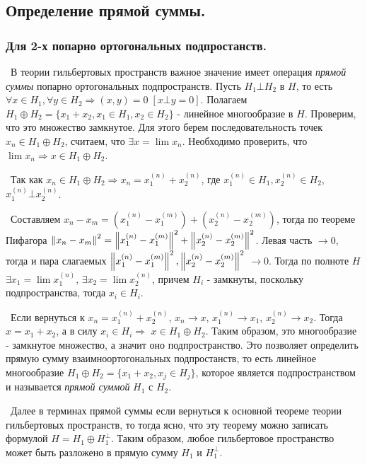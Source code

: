 \subsection*{Определение прямой суммы.}

\subsubsection*{Для 2-х попарно ортогональных подпростанств.}

\noindent\textbullet~В теории гильбертовых пространств важное значение имеет операция \textit{прямой суммы} попарно ортогональных подпространств. Пусть $H_1 \bot H_2$ 
в $H$, то есть $\forall x \in H_1, \forall y \in H_2 \Rightarrow (x, y) = 0 \; [x \bot y = 0]$. Полагаем $H_1 \oplus H_2 = \{ x_1 + x_2, x_1 \in H_1, x_2 \in H_2 \}$ 
- линейное многообразие в $H$. Проверим, что это множество замкнутое. Для этого берем последовательность точек $x_n \in H_1 \oplus H_2$, считаем, что $\exists x = \lim 
x_n$. Необходимо проверить, что $\lim x_n \Rightarrow x \in H_1 \oplus H_2$. 

\smallskip 
\noindent\textbullet~Так как $x_n \in H_1 \oplus H_2 \Rightarrow x_n = x_1^{(n)} +x_2^{(n)}$, где $x_1^{(n)} \in H_1, x_2^{(n)} \in H_2$, $x_1^{(n)} \bot x_2^{(n)}$.

\smallskip 
\noindent\textbullet~Составляем $x_n - x_m = (x_1^{(n)} - x_1^{(m)}) + (x_2^{(n)} - x_2^{(m)})$, тогда по теореме Пифагора $\left\lVert x_n - x_m\right\rVert^2 = \left\lVert x_1^{(n)} - 
x_1^{(m)}\right\rVert^2 + \left\lVert x_2^{(n)} - x_2^{(m)}\right\rVert^2$. Левая часть $\to 0$, тогда и пара слагаемых $\left\lVert x_1^{(n)} - x_1^{(m)}\right\rVert^2, \left\lVert x_2^{(n)} - x_2^{(m)}\right\rVert^2$ $\to 0$. 
Тогда по полноте $H$ $\exists  x_1 = \lim x_1^{(n)}$, $\exists x_2 = \lim x_2^{(n)}$, причем $H_i$ - замкнуты, поскольку подпространства, тогда $x_i \in H_i$.

\smallskip 
\noindent\textasteriskcentered~Если вернуться к $x_n = x_1^{(n)} + x_2^{(n)}$, $x_n \to x$, $x_1^{(n)} \to x_1$, $x_2^{(n)} \to x_2$. Тогда $x = x_1 + x_2$, а в силу 
$x_i \in H_i \Rightarrow$ $x \in H_1 \oplus H_2$. Таким образом, это многообразие - замкнутое множество, а значит оно подпространство. Это позволяет определить прямую
сумму взаимноортогональных подпростанств, то есть линейное многообразие $H_1 \oplus H_2 = \{x_1 + x_2, x_j \in H_j \}$, которое является подпространством и называется
\textit{прямой суммой} $H_1$ с $H_2$.

\medskip
\noindent\textbullet~Далее в терминах прямой суммы если вернуться к основной теореме теории гильбертовых пространств, то тогда ясно, что эту теорему можно записать 
формулой $H = H_1 \oplus H_1^\bot$. Таким образом, любое гильбертовое пространство может быть разложено в прямую сумму $H_1$ и $H_1^\bot$.


